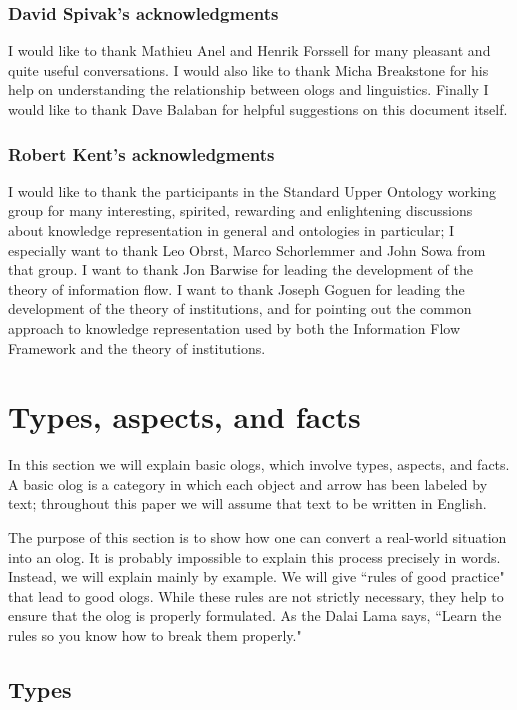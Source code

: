 \subsubsection{David Spivak's acknowledgments}

I would like to thank Mathieu Anel and Henrik Forssell for many pleasant and quite useful conversations. I would also like to thank Micha Breakstone for his help on understanding the relationship between ologs and linguistics. Finally I would like to thank Dave Balaban for helpful suggestions on this document itself.

\subsubsection{Robert Kent's acknowledgments}

I would like to thank the participants in the Standard Upper Ontology working group
for many interesting, spirited, rewarding and enlightening discussions
about knowledge representation in general and ontologies in particular;
I especially want to thank Leo Obrst, Marco Schorlemmer and John Sowa from that group.
I want to thank Jon Barwise 
for leading the development of the theory of information flow.
I want to thank Joseph Goguen 
for leading the development of the theory of institutions,
and for pointing out the common approach to knowledge representation
used by both the Information Flow Framework and the theory of institutions.

\section{Types, aspects, and facts}\label{sec:basic ologs}

In this section we will explain basic ologs, which involve types, aspects, and facts. A basic olog is a category in which each object and arrow has been labeled by text; throughout this paper we will assume that text to be written in English. 

The purpose of this section is to show how one can convert a real-world situation into an olog. It is probably impossible to explain this process precisely in words. Instead, we will explain mainly by example. We will give ``rules of good practice" that lead to good ologs. While these rules are not strictly necessary, they help to ensure that the olog is properly formulated. As the Dalai Lama says, ``Learn the rules so you know how to break them properly."

\subsection{Types}

